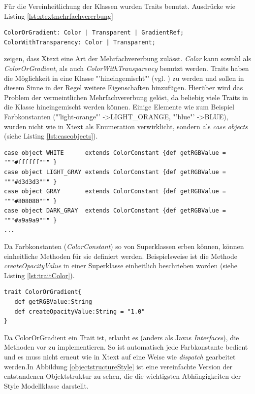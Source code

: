 Für die Vereinheitlichung der Klassen wurden Traits benutzt. Ausdrücke wie Listing \ref{lst:xtextmehrfachvererbung}
\begin{lstlisting}[style=spray, caption = {Auszug aus der Style.xtext Grammatik, Color kann als ColorOrGradient oder als ColorWithTransparency benutzt werden}, label = {lst:xtextmehrfachvererbung}]
ColorOrGradient: Color | Transparent | GradientRef;
ColorWithTransparency: Color | Transparent;
\end{lstlisting}zeigen, dass Xtext eine Art der Mehrfachvererbung zulässt. \textit{Color} kann sowohl als \textit{ColorOrGradient}, als auch \textit{ColorWithTransparency} benutzt werden.
Traits haben die Möglichkeit in eine Klasse "'hineingemischt"' (vgl. ) zu werden und sollen in diesem Sinne in der Regel weitere Eigenschaften hinzufügen. Hierüber wird das Problem der vermeintlichen Mehrfachvererbung gelöst, da beliebig viele Traits in die Klasse hineingemischt werden können.
Einige Elemente wie zum Beispiel Farbkonstanten ("'light-orange"' -\textgreater LIGHT\_ORANGE, "'blue"' -\textgreater BLUE), wurden nicht wie in Xtext als Enumeration verwirklicht, sondern als \textit{case objects} (siehe Listing \ref{lst:caseobjects}).
\begin{lstlisting}[style=scala, caption = {Auszug aus Code ColorConstants als case objects}, label = {lst:caseobjects}]
case object WHITE      extends ColorConstant {def getRGBValue = """#ffffff""" }
case object LIGHT_GRAY extends ColorConstant {def getRGBValue = """#d3d3d3""" }
case object GRAY       extends ColorConstant {def getRGBValue = """#808080""" }
case object DARK_GRAY  extends ColorConstant {def getRGBValue = """#a9a9a9""" }
...
\end{lstlisting}Da Farbkonstanten (\textit{ColorConstant}) so von Superklassen erben können, können einheitliche Methoden für sie definiert werden.
Beispielsweise ist die Methode \textit{createOpacityValue} in einer Superklasse einheitlich beschrieben worden (siehe Listing \ref{lst:traitColor}).\begin{lstlisting}[style=scala, caption = {Auszug aus Code Trait ColorOrGradient}, label = {lst:traitColor}]
trait ColorOrGradient{
   def getRGBValue:String
   def createOpacityValue:String = "1.0"
}
\end{lstlisting}Da ColorOrGradient ein Trait ist, erlaubt es (anders als Javas \textit{Interfaces}), die Methoden vor zu implementieren. So ist automatisch jede Farbkonstante bedient und es muss nicht erneut wie in Xtext auf eine Weise wie \textit{dispatch} gearbeitet werden.\linebreak In Abbildung \ref{objectstructureStyle} ist eine vereinfachte Version der entstandenen Objektstruktur zu sehen, die die wichtigsten Abhängigkeiten der Style Modellklasse darstellt.
